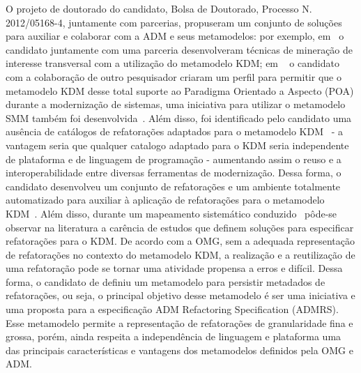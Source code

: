 \documentclass[12pt]{article}
\begin{document}
O projeto de doutorado do candidato, Bolsa de Doutorado, Processo N. 2012/05168-4, juntamente com parcerias, propuseram um conjunto de soluções para auxiliar e colaborar com a ADM e seus metamodelos: por exemplo, em~\cite{dani_san_tool, dani_san, daniel_san_journal} o candidato juntamente com uma parceria desenvolveram técnicas de mineração de interesse transversal com a utilização do metamodelo KDM; em ~\cite{Santos_2014, santo_wmod} o candidato com a colaboração de outro pesquisador criaram um perfil para permitir que o metamodelo KDM desse total suporte ao Paradigma Orientado a Aspecto (POA) durante a modernização de sistemas, uma iniciativa para utilizar o metamodelo SMM também foi desenvolvida~\cite{honda_dissertacao}. Além disso, foi identificado pelo candidato uma ausência de catálogos de refatorações adaptados para o metamodelo KDM~\cite{durelli_systematic_mapping} - a vantagem seria que qualquer catalogo adaptado para o KDM seria independente de plataforma e de linguagem de programação - aumentando assim o reuso e a interoperabilidade entre diversas ferramentas de modernização. Dessa forma, o candidato desenvolveu um conjunto de refatorações e um ambiente totalmente automatizado para auxiliar à aplicação de refatorações para o metamodelo KDM~\cite{durelli_catalogo, durelli_VEM_ferramenta}. Além disso, durante um mapeamento sistemático conduzido~\cite{durelli_systematic_mapping} pôde-se observar na literatura a carência de estudos que definem soluções para especificar refatorações para o KDM. De acordo com a OMG, sem a adequada representação de refatorações no contexto do metamodelo KDM, a realização e a reutilização de uma refatoração pode se tornar uma atividade propensa a erros e difícil. Dessa forma, o candidato de definiu um metamodelo para persistir metadados de refatorações, ou seja, o principal objetivo desse metamodelo é ser uma iniciativa e uma proposta para a especificação ADM Refactoring Specification (ADMRS). Esse metamodelo permite a representação de refatorações de granularidade fina e grossa, porém, ainda respeita a independência de linguagem e plataforma uma das principais características e vantagens dos metamodelos definidos pela OMG e ADM. 
\end{document}
